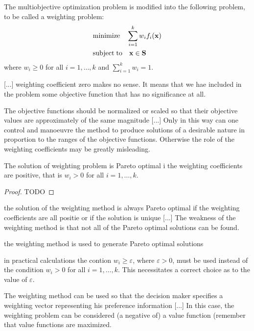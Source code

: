 {{\color{red} The multiobjective optimization problem is modified into the following problem, to be called a weighting problem:}
\begin{align*}
     & \text{minimize}    \quad \sum_{i=1}^k  w_i  f_i(\mathbf{x}) \\
     & \text{subject\;to} \quad \mathbf{x} \in \mathbf{S}
\end{align*}
{\color{red} where $w_i \geq 0$ for all $i = 1, \ldots, k$ and $\sum_{i=1}^k w_i = 1$.}

{\color{red} [...] weighting coefficient zero makes no sense. It means that we hae included in the problem some objective function that has no significance at all.}

{\color{red} The objective functions should be normalized or scaled so that their objective values are approximately of the same magnitude [...] Only in this way can one control and manoeuvre the method to produce solutions of a desirable nature in proportion to the ranges of the objective functions. Otherwise the role of the weighting coefficients may be greatly misleading.}

\begin{proposition}
\label{prop:weighted_method_pareto_optimal}
{\color{red} The solution of weighting problem is Pareto optimal i the weighting coefficients are positive, that is $w_i > 0$ for all $i = 1, \ldots, k$.}
\end{proposition}
\begin{proof}
{\color{red} TODO}
\end{proof}

{\color{red} the solution of the weighting method is always Pareto optimal if the weighting coefficients are all positie or if the solution is unique [...] The weakness of the weighting method is that not all of the Pareto optimal solutions can be found.}

{\color{red} the weighting method is used to generate Pareto optimal solutions}

{\color{red} in practical calculations the contion $w_i \geq \varepsilon$, where $\varepsilon > 0$, must be used instead of the condition $w_i > 0$ for all $i = 1, \ldots, k$. This necessitates a correct choice as to the value of $\varepsilon$.}

{\color{red} The weighting method can be used so that the decision maker specifies a weighting vector representing his preference information [...] In this case, the weighting problem can be considered (a negative of) a value function (remember that value functions are maximized.}

}
